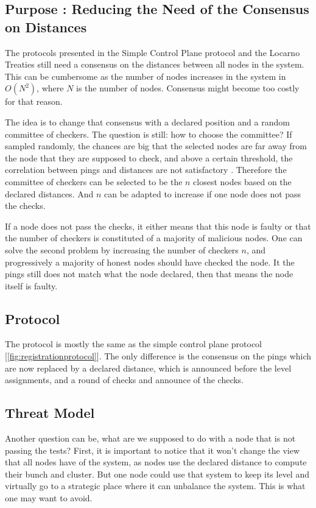 \documentclass[a4paper,11pt,twoside=semi,openright]{report}
\begin{document}
\subsection{Purpose : Reducing the Need of the Consensus on Distances}
The protocols presented in the Simple Control Plane protocol and the Locarno
Treaties still need a consensus on the distances between all nodes in the system.
This can be cumbersome as the number of nodes increases in the system in $O(N^2)$, where $N$ is the number of nodes. Consensus
might become too costly for that reason.

The idea is to change that consensus with a declared position and a random
committee of checkers. The question is still: how to choose the committee? If
sampled randomly, the chances are big that the selected nodes are far away
from the node that they are supposed to check, and above a certain threshold,
the correlation between pings and distances are not satisfactory
\cite{Katz-bassett2006}. Therefore the committee of checkers can be selected to
be the $n$ closest nodes based on the declared distances. And $n$ can be
adapted to increase if one node does not pass the checks. 

If a node does not pass the checks, it either means that this node is faulty or
that the number of checkers is constituted of a majority of malicious nodes.
One can solve the second problem by increasing the number of checkers $n$, and
progressively a majority of honest nodes should have checked the node. It the
pings still does not match what the node declared, then that means the node itself is faulty. 

\subsection{Protocol}
The protocol is mostly the same as the simple control plane protocol
[\autoref{fig:registrationprotocol}]. The only difference is the consensus on
the pings which are now replaced by a declared distance, which is announced
before the level assignments,  and a round of checks and announce of the checks. 

\subsection{Threat Model}
Another question can be, what are we supposed to do with a node that is not
passing the tests? First, it is important to notice that it won't change the
view that all nodes have of the system, as nodes use the declared distance
to compute their bunch and cluster. But one node could use that system to keep
its level and virtually go to a strategic place where it can unbalance the
system. This is what one may want to avoid. 
\end{document}
